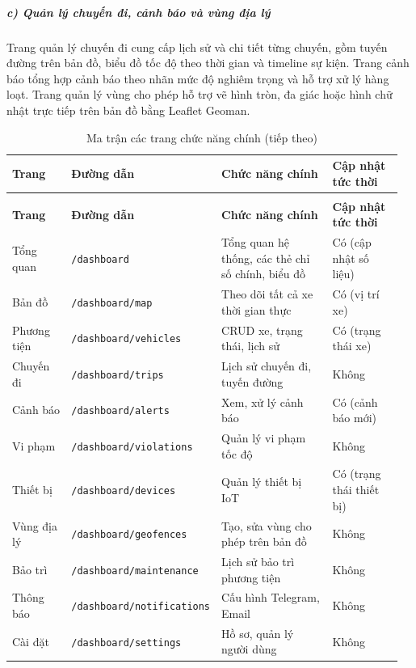 \documentclass[a4paper]{extarticle}
\newcommand{\thesissettableid}[2]{%
  \renewcommand{\thetable}{#1}%
  \renewcommand{\theHtable}{#2}%
}
\begin{document}
\subparagraph{c) Quản lý chuyến đi, cảnh báo và vùng địa
lý}\label{c-quux1ea3n-luxfd-chuyux1ebfn-ux111i-cux1ea3nh-buxe1o-vuxe0-vuxf9ng-ux111ux1ecba-luxfd}

Trang quản lý chuyến đi cung cấp lịch sử và chi tiết từng chuyến, gồm
tuyến đường trên bản đồ, biểu đồ tốc độ theo thời gian và timeline sự
kiện. Trang cảnh báo tổng hợp cảnh báo theo nhãn mức độ nghiêm trọng và
hỗ trợ xử lý hàng loạt. Trang quản lý vùng cho phép hỗ trợ vẽ hình tròn, đa giác
hoặc hình chữ nhật trực tiếp trên bản đồ bằng Leaflet Geoman.


{\thesissettableid{3.27}{tab-ch3-ma-tran-cac-trang-chuc-nang-chinh}
\def\LTcaptype{table}
\begin{longtable}{|L{0.179\linewidth}|L{0.158\linewidth}|L{0.385\linewidth}|L{0.233\linewidth}|}
\caption{Ma trận các trang chức năng chính}\label{tab:ch3-ma-tran-cac-trang-chuc-nang-chinh}\\
\hline \textbf{Trang} & \textbf{Đường dẫn} & \textbf{Chức năng chính} & \textbf{Cập nhật tức thời} \\
\hline
\endfirsthead
\caption[]{Ma trận các trang chức năng chính (tiếp theo)}\\
\hline \textbf{Trang} & \textbf{Đường dẫn} & \textbf{Chức năng chính} & \textbf{Cập nhật tức thời} \\
\hline
\endhead
\hline
\endfoot
\endlastfoot
Tổng quan & \texttt{/dashboard} & Tổng quan hệ thống, các thẻ chỉ số chính, biểu
đồ & Có (cập nhật số liệu) \\\hline
Bản đồ & \nolinkurl{/dashboard/map} & Theo dõi tất cả xe thời gian thực &
Có (vị trí xe) \\\hline
Phương tiện & \nolinkurl{/dashboard/vehicles} & CRUD xe, trạng thái, lịch
sử & Có (trạng thái xe) \\\hline
Chuyến đi & \nolinkurl{/dashboard/trips} & Lịch sử chuyến đi, tuyến đường &
Không \\\hline
Cảnh báo & \nolinkurl{/dashboard/alerts} & Xem, xử lý cảnh báo & Có (cảnh
báo mới) \\\hline
Vi phạm & \nolinkurl{/dashboard/violations} & Quản lý vi phạm tốc độ &
Không \\\hline
Thiết bị & \nolinkurl{/dashboard/devices} & Quản lý thiết bị IoT & Có
(trạng thái thiết bị) \\\hline
Vùng địa lý & \nolinkurl{/dashboard/geofences} & Tạo, sửa vùng cho phép trên bản
đồ & Không \\\hline
Bảo trì & \nolinkurl{/dashboard/maintenance} & Lịch sử bảo trì phương tiện
& Không \\\hline
Thông báo & \nolinkurl{/dashboard/notifications} & Cấu hình Telegram, Email
& Không \\\hline
Cài đặt & \nolinkurl{/dashboard/settings} & Hồ sơ, quản lý người dùng &
Không \\\hline
\end{longtable}
}
\end{document}
